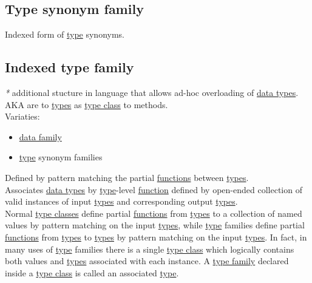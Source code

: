 \documentclass[11pt]{article}
\begin{document}
\subsection{\label{orge339772}Type synonym family}
\label{sec:org4a51630}
Indexed form of \hyperref[orgc4aea2f]{type} synonyms.\\

\subsection{\label{orgbc3c3f9}Indexed type family}
\label{sec:orgf5f247b}
\emph{*} additional stucture in language that allows ad-hoc overloading of \hyperref[org5c444ae]{data types}. AKA are to \hyperref[org4209edd]{types} as \hyperref[org16d8a26]{type class} to methods.\\

Variaties:\\
\begin{itemize}
\item \hyperref[orgd0e0a59]{data family}\\
\item \hyperref[orgc4aea2f]{type} synonym families\\
\end{itemize}

Defined by pattern matching the partial \hyperref[orgaa8fb87]{functions} between \hyperref[org4209edd]{types}.\\
Associates \hyperref[org5c444ae]{data types} by \hyperref[orgc4aea2f]{type}-level \hyperref[orge15bc14]{function} defined by open-ended collection of valid instances of input \hyperref[org4209edd]{types} and corresponding output \hyperref[org4209edd]{types}.\\

Normal \hyperref[orgead20df]{type classes} define partial \hyperref[orgaa8fb87]{functions} from \hyperref[org4209edd]{types} to a collection of named values by pattern matching on the input \hyperref[org4209edd]{types}, while \hyperref[orgc4aea2f]{type} families define partial \hyperref[orgaa8fb87]{functions} from \hyperref[org4209edd]{types} to \hyperref[org4209edd]{types} by pattern matching on the input \hyperref[org4209edd]{types}. In fact, in many uses of \hyperref[orgc4aea2f]{type} families there is a single \hyperref[org16d8a26]{type class} which logically contains both values and \hyperref[org4209edd]{types} associated with each instance. A \hyperref[org5c4264c]{type family} declared inside a \hyperref[org16d8a26]{type class} is called an associated \hyperref[orgc4aea2f]{type}.\\
\end{document}

